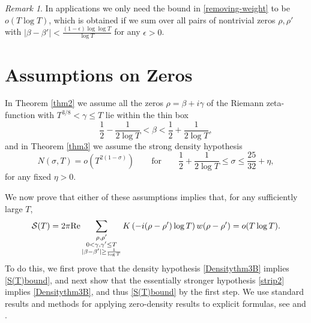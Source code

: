 \documentclass{amsart}
\newcommand{\1}{\mathbbm{1}}
\theoremstyle{remark}
\newtheorem*{remark}{Remark}
\numberwithin{equation}{section}
\begin{document}
\begin{remark} In applications we only need the bound in \eqref{removing-weight} to be $o(T\log{T})$, which is obtained if we sum over all pairs of nontrivial zeros $\rho,\rho'$ with $|\beta-\beta'|<\frac{(1-\epsilon)\log\log{T}}{\log{T}}$ for any $\epsilon>0$.
\end{remark}


\section{Assumptions on Zeros}

In Theorem \ref{thm2} we assume all the zeros $\rho = \beta +i\gamma$ of the Riemann zeta-function with $T^{3/8}<\gamma\le T$ lie within the thin box
\begin{equation}\label{strip2} \frac1{2} -\frac1{2\log T}< \beta < \frac1{2} + \frac1{2\log T}, \end{equation}
and in Theorem \ref{thm3} we assume the strong density hypothesis
\begin{equation}\label{Densitythm3B} N(\sigma, T) = o\left( T^{2(1-\sigma)}\right) \qquad \text{for} \qquad \frac1{2} + \frac1{2\log T} \le \sigma \le \frac{25}{32}+\eta, \end{equation}
for any fixed $\eta>0$. 

We now prove that either of these assumptions implies that,
 for any sufficiently large $T$,
\begin{equation} \label{S(T)bound} \mathcal{S}(T) = 2\pi {\rm Re}\sum_{\substack{\rho, \rho' \\ 0<\gamma,\gamma'\le T\\ |\beta-\beta'| \ge \frac1{\log T}}} K\left(-i(\rho -\rho')\log{T}\right)w(\rho-\rho') = o(T\log T). \end{equation}
To do this, we first prove that the density hypothesis \eqref{Densitythm3B} implies \eqref{S(T)bound}, and next show that the essentially stronger hypothesis \eqref{strip2} implies \eqref{Densitythm3B}, and thus \eqref{S(T)bound} by the first step. We use standard results and methods for applying zero-density results to explicit formulas, see \cite[Chapter 12]{ivic} and \cite[Chapter 10]{IK04}.
\end{document}
